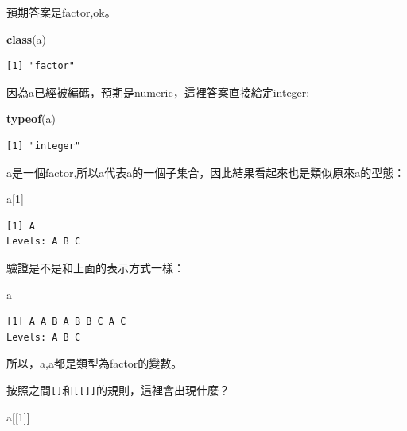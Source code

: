 \documentclass[]{book}
\newenvironment{Shaded}{\begin{snugshade}}{\end{snugshade}}
\newcommand{\DecValTok}[1]{\textcolor[rgb]{0.00,0.00,0.81}{#1}}
\newcommand{\KeywordTok}[1]{\textcolor[rgb]{0.13,0.29,0.53}{\textbf{#1}}}
\newcommand{\NormalTok}[1]{#1}
\theoremstyle{definition}
\theoremstyle{definition}
\theoremstyle{definition}
\theoremstyle{remark}
\begin{document}
預期答案是factor,ok。

\begin{Shaded}
\begin{Highlighting}[]
\KeywordTok{class}\NormalTok{(a)}
\end{Highlighting}
\end{Shaded}

\begin{verbatim}
[1] "factor"
\end{verbatim}

因為a已經被編碼，預期是numeric，這裡答案直接給定integer:

\begin{Shaded}
\begin{Highlighting}[]
\KeywordTok{typeof}\NormalTok{(a)}
\end{Highlighting}
\end{Shaded}

\begin{verbatim}
[1] "integer"
\end{verbatim}

a是一個factor,所以a\protect\hyperlink{section-1}{}代表a的一個子集合，因此結果看起來也是類似原來a的型態：

\begin{Shaded}
\begin{Highlighting}[]
\NormalTok{a[}\DecValTok{1}\NormalTok{]}
\end{Highlighting}
\end{Shaded}

\begin{verbatim}
[1] A
Levels: A B C
\end{verbatim}

驗證是不是和上面的表示方式一樣：

\begin{Shaded}
\begin{Highlighting}[]
\NormalTok{a}
\end{Highlighting}
\end{Shaded}

\begin{verbatim}
[1] A A B A B B C A C
Levels: A B C
\end{verbatim}

所以，a,a\protect\hyperlink{section-1}{}都是類型為factor的變數。

按照之間\texttt{{[}{]}}和\texttt{{[}{[}{]}{]}}的規則，這裡會出現什麼？

\begin{Shaded}
\begin{Highlighting}[]
\NormalTok{a[[}\DecValTok{1}\NormalTok{]]}
\end{Highlighting}
\end{Shaded}
\end{document}
